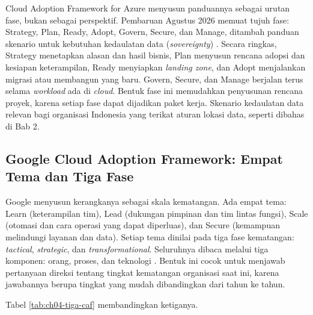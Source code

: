 Cloud Adoption Framework for Azure menyusun panduannya sebagai urutan fase, bukan sebagai
perspektif. Pembaruan Agustus 2026 memuat tujuh fase: Strategy, Plan, Ready, Adopt,
Govern, Secure, dan Manage, ditambah panduan skenario untuk kebutuhan kedaulatan data
(\textit{sovereignty}) \cite{azurecaf}. Secara ringkas, Strategy menetapkan alasan dan
hasil bisnis, Plan menyusun rencana adopsi dan kesiapan keterampilan, Ready menyiapkan
\textit{landing zone}, dan Adopt menjalankan migrasi atau membangun yang baru. Govern,
Secure, dan Manage berjalan terus selama \textit{workload} ada di \textit{cloud}. Bentuk
fase ini memudahkan penyusunan rencana proyek, karena setiap fase dapat dijadikan paket
kerja. Skenario kedaulatan data relevan bagi organisasi Indonesia yang terikat aturan
lokasi data, seperti dibahas di Bab 2.

\subsection*{Google Cloud Adoption Framework: Empat Tema dan Tiga Fase}

Google menyusun kerangkanya sebagai skala kematangan. Ada empat tema: Learn (keterampilan
tim), Lead (dukungan pimpinan dan tim lintas fungsi), Scale (otomasi dan cara operasi
yang dapat diperluas), dan Secure (kemampuan melindungi layanan dan data). Setiap tema
dinilai pada tiga fase kematangan: \textit{tactical}, \textit{strategic}, dan
\textit{transformational}. Seluruhnya dibaca melalui tiga komponen: orang, proses, dan
teknologi \cite{googlecaf}. Bentuk ini cocok untuk menjawab pertanyaan direksi tentang
tingkat kematangan organisasi saat ini, karena jawabannya berupa tingkat yang mudah
dibandingkan dari tahun ke tahun.

Tabel \ref{tab:ch04-tiga-caf} membandingkan ketiganya.

